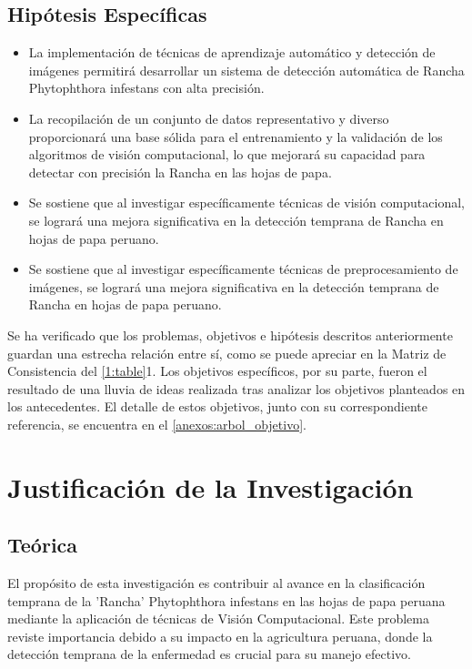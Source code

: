 \subsection{Hipótesis Específicas}
\newcommand{\Hone}{
	La implementación de técnicas de aprendizaje automático y detección de imágenes permitirá desarrollar un sistema de detección automática de Rancha Phytophthora infestans con alta precisión.
}
\newcommand{\Htwo}{
	La recopilación de un conjunto de datos representativo y diverso proporcionará una base sólida para el entrenamiento y la validación de los algoritmos de visión computacional, lo que mejorará su capacidad para detectar con precisión la Rancha en las hojas de papa.
}
\newcommand{\Hthree}{
	Se sostiene que al investigar específicamente técnicas de visión computacional, se logrará una mejora significativa en la detección temprana de Rancha en hojas de papa peruano.
}
\newcommand{\Hfour}{
	Se sostiene que al investigar específicamente técnicas de preprocesamiento de imágenes, se logrará una mejora significativa en la detección temprana de Rancha en hojas de papa peruano.
}
\begin{itemize}
	\item \Hone
	\item \Htwo
	\item \Hthree
	\item \Hfour
\end{itemize}
Se ha verificado que los problemas, objetivos e hipótesis descritos anteriormente guardan una estrecha relación entre sí, como se puede apreciar en la Matriz de Consistencia del \ref{1:table}1.
Los objetivos específicos, por su parte, fueron el resultado de una lluvia de ideas realizada tras analizar los objetivos planteados en los antecedentes. El detalle de estos objetivos, junto con su correspondiente referencia, se encuentra en el \ref{anexos:arbol_objetivo}.
\section{Justificación de la Investigación}

\subsection{Teórica}
El propósito de esta investigación es contribuir al avance en la clasificación temprana de la 'Rancha' Phytophthora infestans en las hojas de papa peruana mediante la aplicación de técnicas de Visión Computacional. Este problema reviste importancia debido a su impacto en la agricultura peruana, donde la detección temprana de la enfermedad es crucial para su manejo efectivo.

